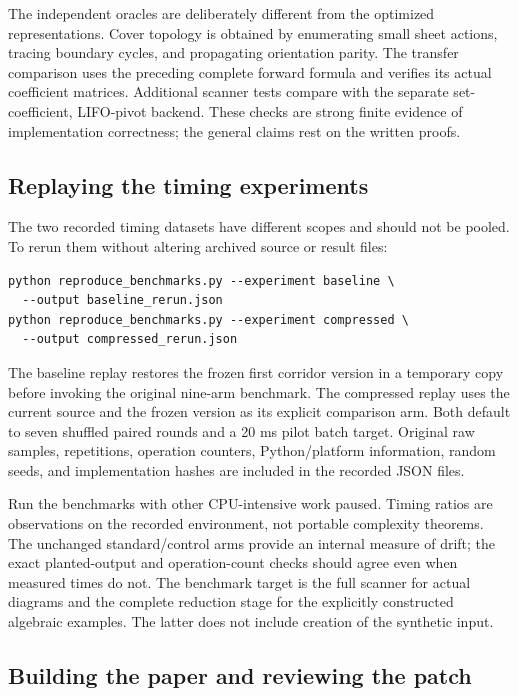 The independent oracles are deliberately different from the optimized
representations. Cover topology is obtained by enumerating small sheet
actions, tracing boundary cycles, and propagating orientation parity.
The transfer comparison uses the preceding complete forward formula
and verifies its actual coefficient matrices. Additional scanner tests
compare with the separate set-coefficient, LIFO-pivot backend. These
checks are strong finite evidence of implementation correctness; the
general claims rest on the written proofs.

\subsection{Replaying the timing experiments}

The two recorded timing datasets have different scopes and should not be
pooled. To rerun them without altering archived source or result files:
\begin{lstlisting}
python reproduce_benchmarks.py --experiment baseline \
  --output baseline_rerun.json
python reproduce_benchmarks.py --experiment compressed \
  --output compressed_rerun.json
\end{lstlisting}

The baseline replay restores the frozen first corridor version in a
temporary copy before invoking the original nine-arm benchmark. The
compressed replay uses the current source and the frozen version as
its explicit comparison arm. Both default to seven shuffled paired
rounds and a 20 ms pilot batch target. Original raw samples, repetitions,
operation counters, Python/platform information, random seeds, and
implementation hashes are included in the recorded JSON files.

Run the benchmarks with other CPU-intensive work paused. Timing ratios
are observations on the recorded environment, not portable complexity
theorems. The unchanged standard/control arms provide an internal
measure of drift; the exact planted-output and operation-count checks
should agree even when measured times do not. The benchmark target is
the full scanner for actual diagrams and the complete reduction stage
for the explicitly constructed algebraic examples. The latter does not
include creation of the synthetic input.

\subsection{Building the paper and reviewing the patch}

